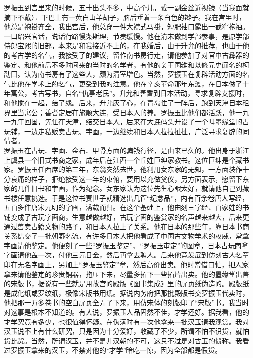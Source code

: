 罗振玉到宫里来的时候，五十出头不多，中高个儿，戴一副金丝近视镜（当我面就摘下不戴），下巴上有一黄白山羊胡子，脑后垂着一条白色的辫子。我在宫里时，他总是袍褂齐全，我出宫后，他总穿一件大襟式马褂，短肥袖口露出一截窄袍袖。一口绍兴官话，说话行路慢条斯理，节奏缓慢。他在清末做到学部参事，是原学部侍郎宝熙的旧部，本来是和我接近不上的，在我婚后，由于升允的推荐，也由于他的考古学的名气，我接受了的建议，留作南书房行走，请他参加了对官中古彝器的鉴定。和他前后不多时间来的当时的名学者，有他的亲王国维和以修元史闻名的柯劭囗。认为南书房有了这些人，颇为清室增色。当然，罗振玉在复辟活动方面的名气比他在学术上的名气，更受到我的注意。他在辛亥革命那年东渡，在日本做了十年寓公，考古写书，自名“仇亭老民”。升允和善耆到日本活动，寻求复辟支援时，和他搅在一起，结了缘。后来，升允灰了心，在青岛住了一阵后，跑到天津日本租界里当寓公；善耆定居在旅顺大连，受日本人的养。罗振玉比他们都活跃，他一九一九年回国，先住在天津，结交日本人，后来在大连码头开设了一个叫墨缘堂的古玩铺，一边走私贩卖古玩、字画，一边继续和日本人拉拉扯扯，广泛寻求复辟的同情者。\\

罗振玉在古玩、字画、金石、甲骨方面的骗钱行径，是由来已久的。他出身于浙江上虞县一个旧式书商之家，成年后在江西一个丘姓巨绅家教书。这位巨绅是个藏书家。罗振玉任西席的第三年，东翁突然去世，他利用女东家的无知，一方面装作十分哀痛的样子，拒绝接受这一年的束俯，要用以充做奠仪，另方面表示，愿留下东家的几件旧书和字画，作为纪念。女东家认为这位先生心眼太好，就请他自己到藏书楼任意挑选。于是这位书贾世子就精选出几筐“纪念品”，内有百余卷唐人写经，五百多件唐宋元明的字画，满载而归。在这个基础上，他由刻三字经、百家姓的书铺变成了古玩字画商，生意越做越好，古玩字画的鉴赏家的名声越来越大，后来更通过售卖古籍文物的路子，和日本人拉上了关系。他在日本的那些年，靠日本书商关系结交了一批朝野名流，有许多日本人把他看成了中国古文物学术的权威，常拿字画请他鉴定。他便刻了一些“罗振玉鉴定”、“罗振玉审定”的图章，日本古玩商拿字画请他盖一次，付他三元日金，然后再拿去骗人。后来他竟发展到仿刻古人名章印在无名字画上，另加上“罗振玉鉴定”章，然后高价出卖。他时常借口忙，把人家拿来请他鉴定的珍贵铜器，拖压下来，尽量多拓下一些拓片出卖。他的墨缘堂出售的宋版书，据说有一些就是用故宫的殿版《图书集成》里的扉页纸伪造的。殿版纸是成化纸或罗纹纸，极像宋版书用纸。据说内务府把那批殿版书交罗振玉代卖时，他把那一万多卷书的空白扉页全弄了下来，用仿宋体的刻版印了“宋版”书。我当时对这事是根本不知道的。有人说，罗振玉人品固然不佳，才学还好。据我看，他的才学究竟有多少，也很值得怀疑。在伪满时有一次他拿来一批汉玉请我观赏。我对汉玉说不上有什么研究，只是因为十分爱好，收藏了不少，所谓不怕不识货，就怕货比货。当然，所谓汉玉，并不是非汉朝的不可，这只不过是对古玉的惯称。我看过罗振玉拿来的汉玉，不禁对他的“才学”暗吃一惊，因为全部都是假货。\\

